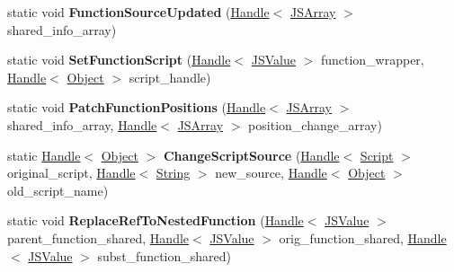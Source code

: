 \begin{DoxyCompactItemize}
\item 
\hypertarget{classv8_1_1internal_1_1_live_edit_ac3bcd4bd0d8c13126218d67544dc6117}{}static void {\bfseries Function\+Source\+Updated} (\hyperlink{classv8_1_1internal_1_1_handle}{Handle}$<$ \hyperlink{classv8_1_1internal_1_1_j_s_array}{J\+S\+Array} $>$ shared\+\_\+info\+\_\+array)\label{classv8_1_1internal_1_1_live_edit_ac3bcd4bd0d8c13126218d67544dc6117}

\item 
\hypertarget{classv8_1_1internal_1_1_live_edit_ae077e76eb5240169ce4a0335840e16b5}{}static void {\bfseries Set\+Function\+Script} (\hyperlink{classv8_1_1internal_1_1_handle}{Handle}$<$ \hyperlink{classv8_1_1internal_1_1_j_s_value}{J\+S\+Value} $>$ function\+\_\+wrapper, \hyperlink{classv8_1_1internal_1_1_handle}{Handle}$<$ \hyperlink{classv8_1_1internal_1_1_object}{Object} $>$ script\+\_\+handle)\label{classv8_1_1internal_1_1_live_edit_ae077e76eb5240169ce4a0335840e16b5}

\item 
\hypertarget{classv8_1_1internal_1_1_live_edit_aadfd0c8a3d53b1e7214ae59052da38e1}{}static void {\bfseries Patch\+Function\+Positions} (\hyperlink{classv8_1_1internal_1_1_handle}{Handle}$<$ \hyperlink{classv8_1_1internal_1_1_j_s_array}{J\+S\+Array} $>$ shared\+\_\+info\+\_\+array, \hyperlink{classv8_1_1internal_1_1_handle}{Handle}$<$ \hyperlink{classv8_1_1internal_1_1_j_s_array}{J\+S\+Array} $>$ position\+\_\+change\+\_\+array)\label{classv8_1_1internal_1_1_live_edit_aadfd0c8a3d53b1e7214ae59052da38e1}

\item 
\hypertarget{classv8_1_1internal_1_1_live_edit_a9a05d33b4381be75f36ddbc1944d108b}{}static \hyperlink{classv8_1_1internal_1_1_handle}{Handle}$<$ \hyperlink{classv8_1_1internal_1_1_object}{Object} $>$ {\bfseries Change\+Script\+Source} (\hyperlink{classv8_1_1internal_1_1_handle}{Handle}$<$ \hyperlink{classv8_1_1internal_1_1_script}{Script} $>$ original\+\_\+script, \hyperlink{classv8_1_1internal_1_1_handle}{Handle}$<$ \hyperlink{classv8_1_1internal_1_1_string}{String} $>$ new\+\_\+source, \hyperlink{classv8_1_1internal_1_1_handle}{Handle}$<$ \hyperlink{classv8_1_1internal_1_1_object}{Object} $>$ old\+\_\+script\+\_\+name)\label{classv8_1_1internal_1_1_live_edit_a9a05d33b4381be75f36ddbc1944d108b}

\item 
\hypertarget{classv8_1_1internal_1_1_live_edit_a5f745ed37ef70144f3bbe2c7fbca71a7}{}static void {\bfseries Replace\+Ref\+To\+Nested\+Function} (\hyperlink{classv8_1_1internal_1_1_handle}{Handle}$<$ \hyperlink{classv8_1_1internal_1_1_j_s_value}{J\+S\+Value} $>$ parent\+\_\+function\+\_\+shared, \hyperlink{classv8_1_1internal_1_1_handle}{Handle}$<$ \hyperlink{classv8_1_1internal_1_1_j_s_value}{J\+S\+Value} $>$ orig\+\_\+function\+\_\+shared, \hyperlink{classv8_1_1internal_1_1_handle}{Handle}$<$ \hyperlink{classv8_1_1internal_1_1_j_s_value}{J\+S\+Value} $>$ subst\+\_\+function\+\_\+shared)\label{classv8_1_1internal_1_1_live_edit_a5f745ed37ef70144f3bbe2c7fbca71a7}


\end{DoxyCompactItemize}
